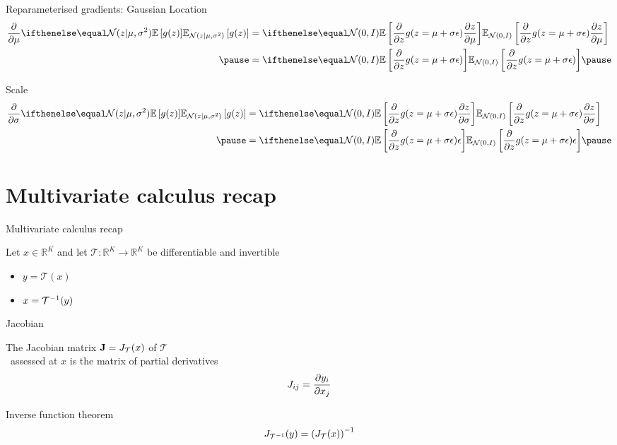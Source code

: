 \documentclass[14pt,dvipsnames]{beamer}
\begin{document}
\begin{frame}{Reparameterised gradients: Gaussian}
	Location
	\begin{equation*}
	\begin{aligned}
		\pdv{\mu} \E[\mathcal N(z|\mu, \sigma^2)]{ g(z) }
			&= \E[\mathcal N(0, I)]{\pdv{z} g(z = \mu + \sigma  \epsilon) \pdv{z}{\mu}} \\ \pause
		&= \E[\mathcal N(0, I)]{\pdv{z} g(z = \mu + \sigma  \epsilon)} \pause
	\end{aligned}
	\end{equation*}
	
	Scale
	\begin{equation*}
	\begin{aligned}
		\pdv{\sigma} \E[\mathcal N(z|\mu, \sigma^2)]{ g(z) } &= \E[\mathcal N(0, I)]{\pdv{z} g(z = \mu + \sigma  \epsilon) \pdv{z}{\sigma}} \\ \pause
		&= \E[\mathcal N(0, I)]{\pdv{z} g(z = \mu + \sigma  \epsilon)  \epsilon} \pause
	\end{aligned}
	\end{equation*}
	
\end{frame}

\section{Multivariate calculus recap}

\begin{frame}{Multivariate calculus recap}

Let $x \in \mathbb R^K$ and let $\mathcal T: \mathbb R^K \to \mathbb R^K$ be differentiable and invertible
\begin{itemize}
	\item $y = \mathcal T(x)$
	\item $x = {\mathcal T}^{-1}(y)$
\end{itemize}

\end{frame}

\begin{frame}{Jacobian}

	The Jacobian matrix $\mathbf J = J_{\mathcal T}(x) $ of  $\mathcal T$ \\
	~assessed at $x$ is the matrix of partial derivatives
	\begin{equation*}
		J_{ij} = \pdv{y_i}{x_j} 
	\end{equation*} 
	
	\pause
	Inverse function theorem
	\begin{equation*}
		J_{{\mathcal T}^{-1}}(y) = \left( J_{\mathcal T}(x) \right)^{-1}
	\end{equation*}
	
\end{frame}
\end{document}
